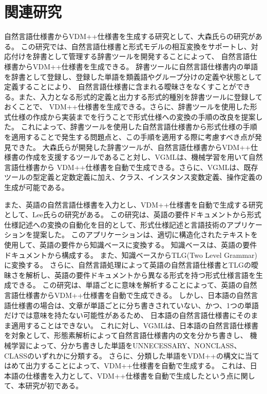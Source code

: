 \section{関連研究}
自然言語仕様書からVDM++仕様書を生成する研究として、大森氏らの研究\cite{research1,research2}がある。
この研究では、自然言語仕様書と形式モデルの相互変換をサポートし、対応付けを辞書として管理する辞書ツールを開発することによって、
自然言語仕様書からVDM++仕様書を生成できる\cite{research1}。
辞書ツールに自然言語仕様書内の単語を辞書として登録し、登録した単語を類義語やグループ分けの定義や状態として定義することにより、
自然言語仕様書に含まれる曖昧さをなくすことができる。また、入力となる形式的定義と出力する形式的種別を辞書ツールに登録しておくことで、
VDM++仕様書を生成できる。さらに、辞書ツールを使用した形式仕様の作成から実装までを行うことで形式仕様への変換の手順の改良を提案した\cite{research2}。
これによって、辞書ツールを使用した自然言語仕様書から形式仕様の手順を適用することで発生する問題点と、この手順を適用する際に考慮すべき点が発見できた。
大森氏らが開発した辞書ツールが、自然言語仕様書からVDM++仕様書の作成を支援するツールであること対し、VGMLは、機械学習を用いて自然言語仕様書から
VDM++仕様書を自動で生成できる。さらに、VGMLは、既存ツールの型定義と定数定義に加え、クラス、インスタンス変数定義、操作定義の生成が可能である。

また、英語の自然言語仕様書を入力とし、VDM++仕様書を自動で生成する研究として、Lee氏らの研究がある\cite{research3}。
この研究は、英語の要件ドキュメントから形式仕様記述への変換の自動化を目的として、形式仕様記述と言語技術のアプリケーションを提案した。
このアプリケーションは、適切に構造化されたテキストを使用して、英語の要件から知識ベースに変換する。
知識ベースは、英語の要件ドキュメントから構成する。
また、知識ベースからTLG(Two Level Grammar)に変換する。
さらに、自然言語処理によって英語の自然言語仕様書とTLGの曖昧さを解析し、英語の要件ドキュメントから異なる形式を持つ形式仕様言語を生成できる。
この研究は、単語ごとに意味を解析することによって、英語の自然言語仕様書からVDM++仕様書を自動で生成できる。
しかし、日本語の自然言語仕様書の場合は、文章が単語ごとに分ち書きされていない、かつ、1つの単語だけでは意味を持たない可能性があるため、
日本語の自然言語仕様書にそのまま適用することはできない。
これに対し、VGMLは、日本語の自然言語仕様書を対象として、形態素解析によって自然言語仕様書内の文を分かち書きし、
機械学習によって、分かち書きした単語をUNNECESSARY、NONCLASS、CLASSのいずれかに分類する。
さらに、分類した単語をVDM++の構文に当てはめて出力することによって、VDM++仕様書を自動で生成する。
これは、日本語の仕様書を入力として、VDM++仕様書を自動で生成したという点に関して、本研究が初である。


